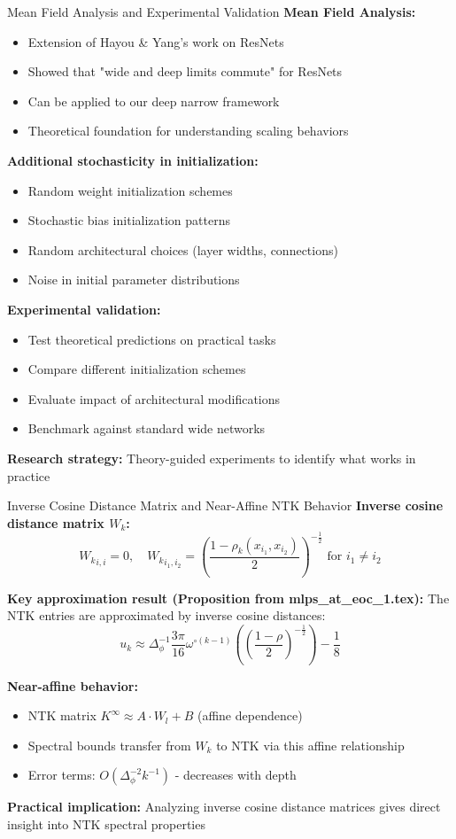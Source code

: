 \documentclass{beamer}
\newcommand{\limiting}[1]{#1^{\infty}}
\begin{document}
\begin{frame}{Mean Field Analysis and Experimental Validation}
\textbf{Mean Field Analysis:}
\begin{itemize}
\item Extension of Hayou \& Yang's work on ResNets
\item Showed that "wide and deep limits commute" for ResNets
\item Can be applied to our deep narrow framework
\item Theoretical foundation for understanding scaling behaviors
\end{itemize}

\textbf{Additional stochasticity in initialization:}
\begin{itemize}
\item Random weight initialization schemes
\item Stochastic bias initialization patterns
\item Random architectural choices (layer widths, connections)
\item Noise in initial parameter distributions
\end{itemize}

\textbf{Experimental validation:}
\begin{itemize}
\item Test theoretical predictions on practical tasks
\item Compare different initialization schemes
\item Evaluate impact of architectural modifications
\item Benchmark against standard wide networks
\end{itemize}

\textbf{Research strategy:} Theory-guided experiments to identify what works in practice
\end{frame}

\begin{frame}{Inverse Cosine Distance Matrix and Near-Affine NTK Behavior}
\textbf{Inverse cosine distance matrix $W_k$:}
\[ {W_k}_{i,i} = 0, \quad {W_k}_{i_1,i_2} = \left( \frac{1 - \rho_k(x_{i_1},x_{i_2})}{2} \right)^{-\frac{1}{2}} \text{ for } i_1 \neq i_2 \]

\textbf{Key approximation result (Proposition from mlps\_at\_eoc\_1.tex):}
The NTK entries are approximated by inverse cosine distances:
\[ u_k \approx \Delta_\phi^{-1} \frac{3\pi}{16} \omega^{\circ (k-1)}\left( \left( \frac{1-\rho}{2} \right)^{-\frac{1}{2}} \right) - \frac{1}{8} \]

\textbf{Near-affine behavior:}
\begin{itemize}
\item NTK matrix $\limiting{K} \approx A \cdot W_l + B$ (affine dependence)
\item Spectral bounds transfer from $W_k$ to NTK via this affine relationship
\item Error terms: $O(\Delta_\phi^{-2} k^{-1})$ - decreases with depth
\end{itemize}

\textbf{Practical implication:} Analyzing inverse cosine distance matrices gives direct insight into NTK spectral properties
\end{frame}
\end{document}
